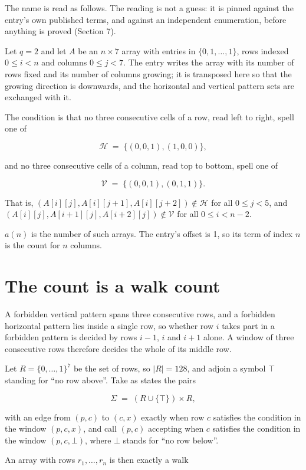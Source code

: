 \documentclass[11pt]{article}
\theoremstyle{definition}
\begin{document}
The name is read as follows. The reading is not a guess: it is pinned against the entry's own published terms, and against an independent enumeration, before anything is proved (Section 7).

Let $q = 2$ and let $A$ be an $n \times 7$ array with entries in $\{0,1,\dots,1\}$, rows indexed $0 \le i < n$ and columns $0 \le j < 7$. The entry writes the array with its number of rows fixed and its number of columns growing; it is transposed here so that the growing direction is downwards, and the horizontal and vertical pattern sets are exchanged with it.

The condition is that no three consecutive cells of a row, read left to right, spell one of

\[\mathcal{H} \;=\; \{(0,0,1), (1,0,0)\},\]

and no three consecutive cells of a column, read top to bottom, spell one of

\[\mathcal{V} \;=\; \{(0,0,1), (0,1,1)\}.\]

That is, $(A[i][j],A[i][j{+}1],A[i][j{+}2]) \notin \mathcal{H}$ for all $0 \le j < 5$, and $(A[i][j],A[i{+}1][j],A[i{+}2][j]) \notin \mathcal{V}$ for all $0 \le i < n-2$.

$a(n)$ is the number of such arrays. The entry's offset is 1, so its term of index $n$ is the count for $n$ columns.

\section{The count is a walk count}

A forbidden vertical pattern spans three consecutive rows, and a forbidden horizontal pattern lies inside a single row, so whether row $i$ takes part in a forbidden pattern is decided by rows $i-1$, $i$ and $i+1$ alone. A window of three consecutive rows therefore decides the whole of its middle row.

Let $R = \{0,\dots,1\}^{7}$ be the set of rows, so $|R| = 128$, and adjoin a symbol $\top$ standing for ``no row above''. Take as states the pairs

\[\Sigma \;=\; (R \cup \{\top\}) \times R,\]

with an edge from $(p,c)$ to $(c,x)$ exactly when row $c$ satisfies the condition in the window $(p,c,x)$, and call $(p,c)$ accepting when $c$ satisfies the condition in the window $(p,c,\bot)$, where $\bot$ stands for ``no row below''.

An array with rows $r_1,\dots,r_n$ is then exactly a walk
\end{document}
